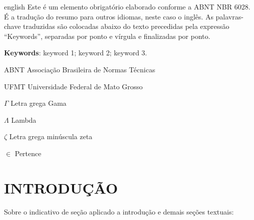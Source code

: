 \documentclass[
	12pt,				%
	openright,			%
	oneside,			%
	a4paper,			%
	english,			%
	french,				%
	spanish,			%
	brazil				%
	]{abntex2UFMT}
\begin{document}
\begin{resumo}[ABSTRACT]
 \begin{otherlanguage*}{english}
Este é um elemento obrigatório elaborado conforme a ABNT NBR 6028. É a tradução do resumo para outros idiomas, neste caso o inglês. As palavras-chave traduzidas são colocadas abaixo do texto precedidas pela expressão “Keywords”, separadas por ponto e vírgula e finalizadas por ponto.

 
 \textbf{Keywords}: keyword 1; keyword 2; keyword 3.
 \end{otherlanguage*}
\end{resumo}


\listoffigures*
\cleardoublepage

\listoftables*
\cleardoublepage

\begin{siglas}
  \item[ABNT] Associação Brasileira de Normas Técnicas
  \item[UFMT] Universidade Federal de Mato Grosso
\end{siglas}

\begin{simbolos}
  \item[$ \Gamma $] Letra grega Gama
  \item[$ \Lambda $] Lambda
  \item[$ \zeta $] Letra grega minúscula zeta
  \item[$ \in $] Pertence
\end{simbolos}

\renewcommand{\contentsname}{\bfseries\large SUM\'ARIO}
\pdfbookmark[0]{\contentsname}{toc}
\tableofcontents*
\cleardoublepage




\chapter{INTRODUÇÃO}\label{INTRODUÇÃO}
Sobre o indicativo de seção aplicado a introdução e demais seções textuais:
\end{document}

